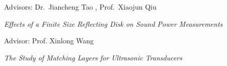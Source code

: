 \documentclass[10pt,a4paper,ragged2e,withhyper]{altacv}
\begin{document}
\faUserTie Advisors: Dr.\ Jiancheng Tao \href{https://scholar.google.com/citations?user=99XAu60AAAAJ}{\color{accent}\aiGoogleScholarSquare}\hspace{0.1cm},
Prof.\ Xiaojun Qiu \href{https://scholar.google.com/citations?user=UdYuQmYAAAAJ&hl=en}{\color{accent}\aiGoogleScholarSquare}\href{https://orcid.org/0000-0002-5181-1220}{\color{accent}\faOrcid}

\faBook \textit{Effects of a Finite Size Reflecting Disk on Sound Power Measurements}

\divider


\faUserTie Advisor: Prof. Xinlong Wang\href{https://orcid.org/0000-0002-8137-1692}{\color{accent}\faOrcid}

\faBook \textit{The Study of Matching Layers for Ultrasonic Transducers}


\medskip














\end{document}

